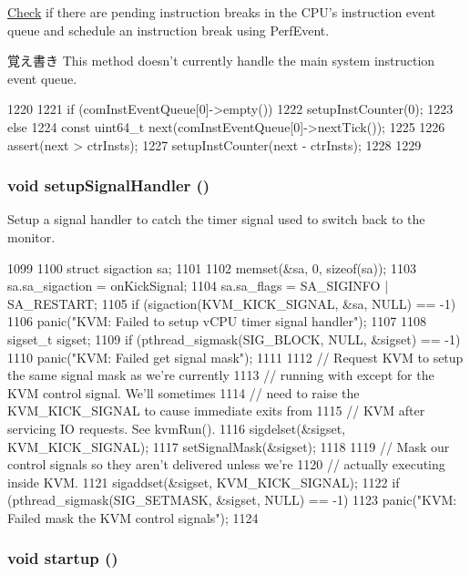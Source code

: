 \hyperlink{classCheck}{Check} if there are pending instruction breaks in the CPU's instruction event queue and schedule an instruction break using PerfEvent.

\begin{DoxyNote}{覚え書き}
This method doesn't currently handle the main system instruction event queue. 
\end{DoxyNote}



\begin{DoxyCode}
1220 {
1221     if (comInstEventQueue[0]->empty()) {
1222         setupInstCounter(0);
1223     } else {
1224         const uint64_t next(comInstEventQueue[0]->nextTick());
1225 
1226         assert(next > ctrInsts);
1227         setupInstCounter(next - ctrInsts);
1228     }
1229 }
\end{DoxyCode}
\hypertarget{classBaseKvmCPU_acae9fda1e38c2cd8a3d7c8659a4a66fa}{
\subsubsection[{setupSignalHandler}]{\setlength{\rightskip}{0pt plus 5cm}void setupSignalHandler ()}}
\label{classBaseKvmCPU_acae9fda1e38c2cd8a3d7c8659a4a66fa}
Setup a signal handler to catch the timer signal used to switch back to the monitor. 


\begin{DoxyCode}
1099 {
1100     struct sigaction sa;
1101 
1102     memset(&sa, 0, sizeof(sa));
1103     sa.sa_sigaction = onKickSignal;
1104     sa.sa_flags = SA_SIGINFO | SA_RESTART;
1105     if (sigaction(KVM_KICK_SIGNAL, &sa, NULL) == -1)
1106         panic("KVM: Failed to setup vCPU timer signal handler\n");
1107 
1108     sigset_t sigset;
1109     if (pthread_sigmask(SIG_BLOCK, NULL, &sigset) == -1)
1110         panic("KVM: Failed get signal mask\n");
1111 
1112     // Request KVM to setup the same signal mask as we're currently
1113     // running with except for the KVM control signal. We'll sometimes
1114     // need to raise the KVM_KICK_SIGNAL to cause immediate exits from
1115     // KVM after servicing IO requests. See kvmRun().
1116     sigdelset(&sigset, KVM_KICK_SIGNAL);
1117     setSignalMask(&sigset);
1118 
1119     // Mask our control signals so they aren't delivered unless we're
1120     // actually executing inside KVM.
1121     sigaddset(&sigset, KVM_KICK_SIGNAL);
1122     if (pthread_sigmask(SIG_SETMASK, &sigset, NULL) == -1)
1123         panic("KVM: Failed mask the KVM control signals\n");
1124 }
\end{DoxyCode}
\hypertarget{classBaseKvmCPU_aecc7d8debf54990ffeaaed5bac7d7d81}{
\subsubsection[{startup}]{\setlength{\rightskip}{0pt plus 5cm}void startup ()}}
\label{classBaseKvmCPU_aecc7d8debf54990ffeaaed5bac7d7d81}


